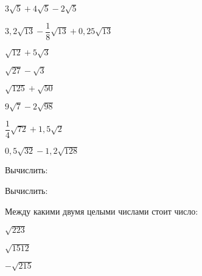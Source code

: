 \begin{class}[number=3]
\begin{listofex}
		\begin{enumcols}[itemcolumns=2]
			\item \( 3\sqrt{5}+4\sqrt{5}-2\sqrt{5} \)
			\item \( 3,2\sqrt{13}-\dfrac{1}{8}\sqrt{13}+0,25\sqrt{13} \)
			\item \( \sqrt{12}+5\sqrt{3} \)
			\item \( \sqrt{27}-\sqrt{3} \)
			\item \( \sqrt{125}+\sqrt{50} \)
			\item \( 9\sqrt{7}-2\sqrt{98} \)
			\item \( \dfrac{1}{4}\sqrt{72}+1,5\sqrt{2} \)
			\item \( 0,5\sqrt{32}-1,2\sqrt{128} \)
		\end{enumcols}
		\item Вычислить:
		\begin{enumcols}[itemcolumns=3]
			\item {}
			\item {}
			\item {}
			\item {}
			\item {}
			\item {}
		\end{enumcols}
		\item Вычислить:
		\begin{enumcols}[itemcolumns=3]
			\item {}
			\item {}
			\item {}
			\item {}
			\item {}
			\item {}
			\item {}
		\end{enumcols}
		\item Между какими двумя целыми числами стоит число:
		\begin{enumcols}[itemcolumns=3]
			\item \( \sqrt{223} \)
			\item \( \sqrt{1512} \)
			\item \( -\sqrt{215} \)
		\end{enumcols}
	\end{listofex}
\end{class}
%
